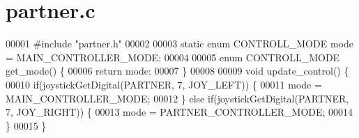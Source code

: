 \section{partner.\+c}
\label{partner_8c_source}

\begin{DoxyCode}
00001 \textcolor{preprocessor}{#include "partner.h"}
00002 
00003 \textcolor{keyword}{static} \textcolor{keyword}{enum} CONTROLL_MODE mode = MAIN_CONTROLLER_MODE;
00004 
00005 \textcolor{keyword}{enum} CONTROLL_MODE get_mode() \{
00006   \textcolor{keywordflow}{return} mode;
00007 \}
00008 
00009 \textcolor{keywordtype}{void} update_control() \{
00010   \textcolor{keywordflow}{if}(joystickGetDigital(PARTNER, 7, JOY\_LEFT)) \{
00011     mode = MAIN_CONTROLLER_MODE;
00012   \} \textcolor{keywordflow}{else} \textcolor{keywordflow}{if}(joystickGetDigital(PARTNER, 7, JOY\_RIGHT)) \{
00013     mode = PARTNER_CONTROLLER_MODE;
00014   \}
00015 \}
\end{DoxyCode}
